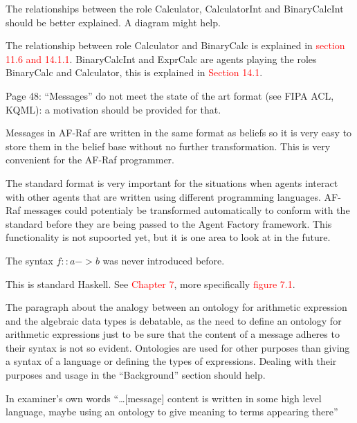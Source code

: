 \documentclass{article}
\newcommand*\R[1]{\textcolor{red}{#1}} %
\newenvironment{them}{\noindent\begingroup\color{blue}}{\endgroup\par}
\begin{document}
\begin{them}

The relationships between the role Calculator, CalculatorInt and BinaryCalcInt
should be better explained. A diagram might help.

\end{them}
The relationship between role Calculator and BinaryCalc is explained in
\R{section 11.6 and 14.1.1}. BinaryCalcInt and ExprCalc are agents playing the
roles BinaryCalc and Calculator, this is explained in \R{Section 14.1}.

\begin{them}

Page 48:
``Messages'' do not meet the state of the art format (see FIPA ACL, KQML): a
motivation should be provided for that.

\end{them}

Messages in AF-Raf are written in the same format as beliefs so it is very easy
to store them in the belief base without no further transformation. This is
very convenient for the AF-Raf programmer. 

The standard format is very important for the situations when agents interact
with other agents that are written using different programming languages.
AF-Raf messages could potentialy be transformed automatically to conform with
the standard before they are being passed to the Agent Factory framework. This
functionality is not supoorted yet, but it is one area to look at in the
future.

\begin{them}

The syntax $f::a->b$ was never introduced before.
\end{them}
This is standard Haskell. See \R{Chapter 7}, more specifically \R{figure 7.1}.

\begin{them}

The paragraph about the analogy between an ontology for arithmetic expression
and the algebraic data types is debatable, as the need to define an ontology
for arithmetic expressions just to be sure that the content of a message
adheres to their syntax is not so evident. Ontologies are used for other
purposes than giving a syntax of a language or defining the types of
expressions. Dealing with their purposes and usage in the ``Background'' section
should help.

\end{them}
In examiner's own words ``\ldots [message] content is written in some high
level language, maybe using an ontology to give meaning to terms appearing
there''
\end{document}
